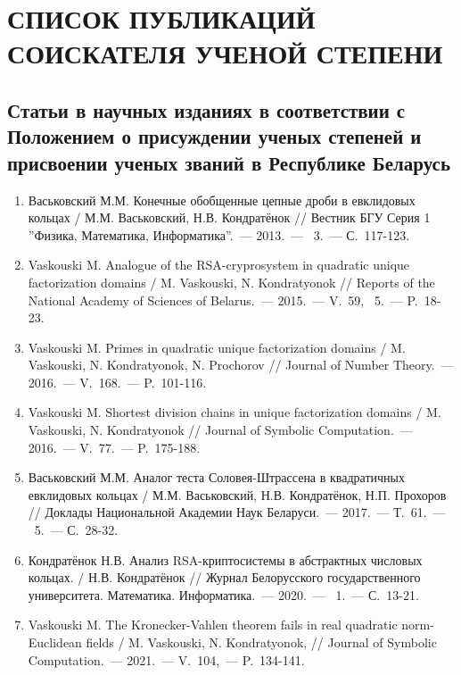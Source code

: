 \documentclass[_00_autoref.tex]{subfiles}
\begin{document}
\chapter*{\MakeUppercase{Список публикаций соискателя ученой степени}}

\vspace{-4ex}
\section*{\fontsize{14}{15}\selectfont Статьи в научных изданиях в соответствии с Положением о присуждении ученых степеней и присвоении ученых званий в Республике Беларусь}
\vspace{-4ex}

\renewcommand{\labelenumi}{\arabic{enumi}}
\renewcommand{\theenumi}{\arabic{enumi}}

\begin{enumerate}

    \item \label{source:Vestnik_BSU_2013}
    Васьковский М.М. Конечные обобщенные цепные дроби в евклидовых кольцах / М.М. Васьковский, Н.В. Кондратёнок // Вестник БГУ Серия 1 ''Физика, Математика, Информатика''.~--- 2013.~--- \textnumero~3.~--- С.~117-123.

    \item \label{source:NANB_2015}
    Vaskouski M. Analogue of the RSA-cryprosystem in quadratic unique factorization domains / M. Vaskouski, N. Kondratyonok // Reports of the National Academy of Sciences of Belarus.~--- 2015.~--- V.~59, \textnumero~5.~--- P.~18-23.

    \item \label{source:JNT_2016}
    Vaskouski M. Primes in quadratic unique factorization domains / M. Vaskouski, N. Kondratyonok, N. Prochorov // Journal of Number Theory.~--- 2016.~--- V.~168.~--- P.~101-116.

    \item \label{source:JSC_2016}
    Vaskouski M. Shortest division chains in unique factorization domains / M. Vaskouski, N. Kondratyonok // Journal of Symbolic Computation.~--- 2016.~--- V.~77.~--- P.~175-188.

    \item \label{source:NANB_2017}
    Васьковский М.М. Аналог теста Соловея-Штрассена в квадратичных евклидовых кольцах / М.М. Васьковский, Н.В. Кондратёнок, Н.П. Прохоров // Доклады Национальной Академии Наук Беларуси.~--- 2017.~--- Т.~61.~--- \textnumero~5.~--- С.~28-32.

    \item \label{source:BSU_Journal_2020}
    Кондратёнок Н.В. Анализ RSA-криптосистемы в абстрактных числовых кольцах. / Н.В. Кондратёнок // Журнал Белорусского государственного университета. Математика. Информатика.~--- 2020.~--- \textnumero~1.~--- С.~13-21.

    \item \label{source:JSC_2021}
    Vaskouski M. The Kronecker-Vahlen theorem fails in real quadratic norm-Eucli\-dean fields / M. Vaskouski, N. Kondratyonok, // Journal of Symbolic Computation.~--- 2021.~--- V.~104,~--- P.~134-141.

\end{enumerate}
\end{document}
